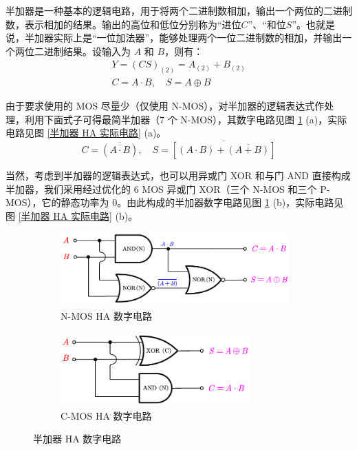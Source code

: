 \documentclass[UTF8]{report}
\theoremstyle{MyLineTheoremStyle} %
\theoremstyle{MyBlockTheoremStyle} %
\theoremstyle{MySubsubsectionStyle} %
\begin{document}
半加器是一种基本的逻辑电路，用于将两个二进制数相加，输出一个两位的二进制数，表示相加的结果。输出的高位和低位分别称为“进位$C$”、“和位$S$”。也就是说，半加器实际上是“一位加法器”，能够处理两个一位二进制数的相加，并输出一个两位二进制结果。设输入为 $A$ 和 $B$，则有：
\begin{gather}
    Y = (C S)_{(2)} = A_{(2)} + B_{(2)}
    \\
    C = A \cdot B,\quad S = A \oplus B
\end{gather}

由于要求使用的 MOS 尽量少（仅使用 N-MOS），对半加器的逻辑表达式作处理，利用下面式子可得最简半加器（7 个 N-MOS），其数字电路见图 \ref{半加器 HA 数字电路} (a)，实际电路见图 \ref{半加器 HA 实际电路} (a)。
\begin{equation}
    C = \overline{(\overline{A\cdot B})},\quad S = \overline{\left[(A \cdot B) + \overline{(A + B)}\right]}
\end{equation}

当然，考虑到半加器的逻辑表达式，也可以用异或门 XOR 和与门 AND 直接构成半加器，我们采用经过优化的 6 MOS 异或门 XOR（三个 N-MOS 和三个 P-MOS），它的静态功率为 0。由此构成的半加器数字电路见图 \ref{半加器 HA 数字电路} (b)，实际电路见图 \ref{半加器 HA 实际电路} (b)。

\begin{figure}[H]\centering
\begin{subfigure}[t]{0.5\columnwidth}\centering
    \includegraphics[height=80pt]{assets/5/NMOS 半加器数字电路.pdf}
    \caption{ N-MOS HA 数字电路}
\end{subfigure}\hfill
\begin{subfigure}[t]{0.5\columnwidth}\centering
    \includegraphics[height=80pt]{assets/5/CMOS 半加器数字电路.pdf}
    \caption{ C-MOS HA 数字电路 }
\end{subfigure}
\caption{ 半加器 HA 数字电路 }\label{半加器 HA 数字电路}
\end{figure}
\end{document}
